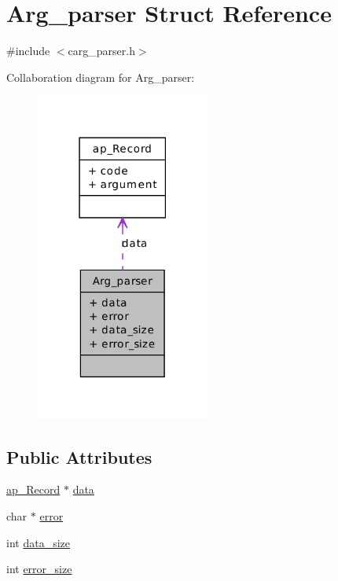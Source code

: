 \hypertarget{structArg__parser}{
\section{Arg\_\-parser Struct Reference}
\label{d3/d3f/structArg__parser}
}


{\ttfamily \#include $<$carg\_\-parser.h$>$}



Collaboration diagram for Arg\_\-parser:\nopagebreak
\begin{figure}[H]
\begin{center}
\leavevmode
\includegraphics[width=162pt]{d5/dbf/structArg__parser__coll__graph}
\end{center}
\end{figure}
\subsection*{Public Attributes}
\begin{DoxyCompactItemize}
\item 
\hyperlink{structap__Record}{ap\_\-Record} $\ast$ \hyperlink{structArg__parser_af9d6960e35a9e4156790adbd085c9e31}{data}
\item 
char $\ast$ \hyperlink{structArg__parser_ab79bfc3b12298a8b0c0aad3e3a93f0c1}{error}
\item 
int \hyperlink{structArg__parser_a005a55925acfc47d3b05725c9ac0ccc8}{data\_\-size}
\item 
int \hyperlink{structArg__parser_a024f512b62a4bd894f192b22b9e3ed36}{error\_\-size}
\end{DoxyCompactItemize}


